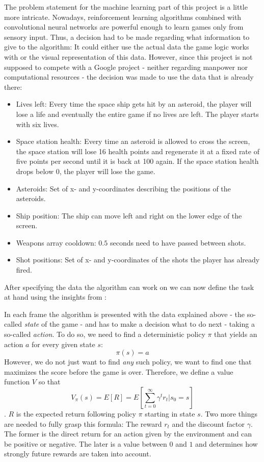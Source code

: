 \documentclass[a4paper,10pt]{article}
\begin{document}
The problem statement for the machine learning part of this project is a little more intricate.
Nowadays, reinforcement learning algorithms combined with convolutional neural networks are powerful enough to learn games only from sensory input\cite{DeepmindBreakout}.
Thus, a decision had to be made regarding what information to give to the algorithm:
It could either use the actual data the game logic works with or the visual representation of this data.
However, since this project is not supposed to compete with a Google project - neither regarding manpower nor computational resources - the decision was made to use the data that is already there:

\begin{itemize}
 \item Lives left: Every time the space ship gets hit by an asteroid, the player will lose a life and eventually the entire game if no lives are left. The player starts with six lives.
 \item Space station health: Every time an asteroid is allowed to cross the screen, the space station will lose 16 health points and regenerate it at a fixed rate of five points per second until it is back at 100 again. If the space station health drops below $0$, the player will lose the game.
 \item Asteroids: Set of x- and y-coordinates describing the positions of the asteroids.
 \item Ship position: The ship can move left and right on the lower edge of the screen.
 \item Weapons array cooldown: $0.5$ seconds need to have passed between shots.
 \item Shot positions: Set of x- and y-coordinates of the shots the player has already fired.
\end{itemize}

After specifying the data the algorithm can work on we can now define the task at hand using the insights from \cite{712192}:

In each frame the algorithm is presented with the data explained above - the so-called \emph{state} of the game - and has to make a decision what to do next - taking a so-called \emph{action}.
To do so, we need to find a deterministic policy $\pi$ that yields an action $a$ for every given state $s$:
\[\pi(s)=a\]
However, we do not just want to find \emph{any} such policy, we want to find one that maximizes the score before the game is over. 
Therefore, we define a value function $V$ so that
\[V_\pi(s) = E[R] = E[\sum_{t=0}^\infty\gamma^tr_t|s_0=s]\].
$R$ is the expected return following policy $\pi$ starting in state $s$.
Two more things are needed to fully grasp this formula: The reward $r_t$ and the discount factor $\gamma$.
The former is the direct return for an action given by the environment and can be positive or negative.
The later is a value between $0$ and $1$ and determines how strongly future rewards are taken into account.
\end{document}
